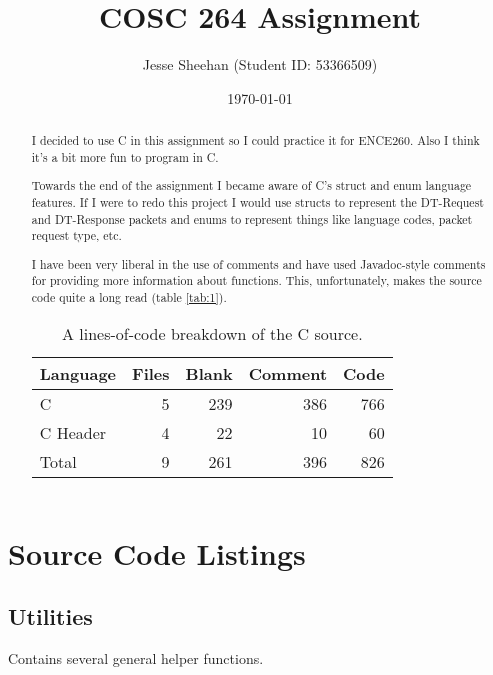 \documentclass[11pt]{article} %
\title{COSC 264 Assignment}
\date{\today}
\author{Jesse Sheehan (Student ID: 53366509)}
\newcommand{\includecode}[2][c]{\begin{mdframed}\inputminted[linenos=true, breaklines]{#1}{#2}\end{mdframed}}
\begin{document}
\begin{titlepage}

\maketitle

\hrulefill

\begin{abstract}
I decided to use C in this assignment so I could practice it for ENCE260. Also I think it's a bit more fun to program in C.

Towards the end of the assignment I became aware of C's struct and enum language features. If I were to redo this project I would use structs to represent the DT-Request and DT-Response packets and enums to represent things like language codes, packet request type, etc.

I have been very liberal in the use of comments and have used Javadoc-style comments for providing more information about functions. This, unfortunately, makes the source code quite a long read (table \ref{tab:1}).

\begin{table}[H]
	\centering
  \begin{tabular}{ |l|r|r|r|r| }
	\hline
	Language & Files & Blank & Comment & Code \\ \hline
	C & 5 & 239 & 386 & 766 \\
	C Header & 4 & 22 & 10 & 60 \\ \hline \hline
	Total & 9 & 261 & 396 & 826 \\ \hline
  \end{tabular}
  \caption{A lines-of-code breakdown of the C source.}
  \label{tab:1}
\end{table}

\end{abstract}

\tableofcontents

\end{titlepage}
\setcounter{page}{2}


\section{Source Code Listings}

\subsection{Utilities}
Contains several general helper functions.
\includecode{../src/utils.h}
\includecode{../src/utils.c}
\end{document}
